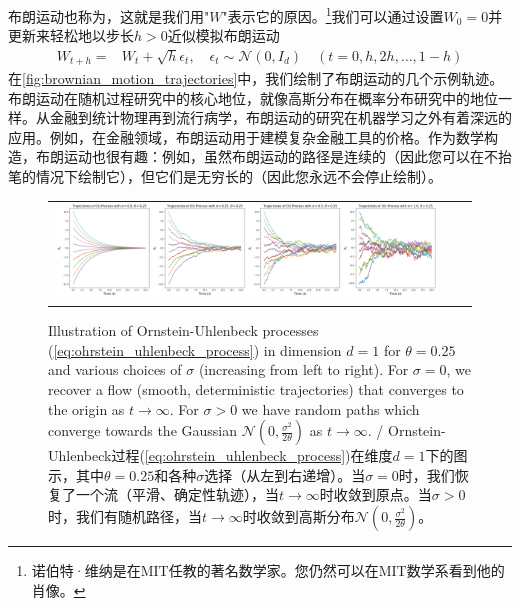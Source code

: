 布朗运动也称为，这就是我们用"$W$"表示它的原因。\footnote{诺伯特·维纳是在MIT任教的著名数学家。您仍然可以在MIT数学系看到他的肖像。}我们可以通过设置$W_0=0$并更新来轻松地以步长$h>0$近似模拟布朗运动
\begin{align}
    W_{t+h} =& W_{t} + \sqrt{h}\epsilon_t,\quad \epsilon_t\sim\mathcal{N}(0,I_d)\quad (t=0,h,2h,\dots,1-h)
\end{align}
在\cref{fig:brownian_motion_trajectories}中，我们绘制了布朗运动的几个示例轨迹。布朗运动在随机过程研究中的核心地位，就像高斯分布在概率分布研究中的地位一样。从金融到统计物理再到流行病学，布朗运动的研究在机器学习之外有着深远的应用。例如，在金融领域，布朗运动用于建模复杂金融工具的价格。作为数学构造，布朗运动也很有趣：例如，虽然布朗运动的路径是连续的（因此您可以在不抬笔的情况下绘制它），但它们是无穷长的（因此您永远不会停止绘制）。

\begin{figure}
    \centering
    \begin{tabular}{ccc}
         \includegraphics[width=\textwidth]{figures/ou_process.png} &
    \end{tabular}
    \caption{\label{fig:bm_ou_process} Illustration of Ornstein-Uhlenbeck processes (\cref{eq:ohrstein_uhlenbeck_process}) in dimension $d=1$ for $\theta=0.25$ and various choices of $\sigma$ (increasing from left to right). For $\sigma=0$, we recover a flow (smooth, deterministic trajectories) that converges to the origin as $t \to \infty$. For $\sigma>0$ we have random paths which converge towards the Gaussian $\mathcal{N}(0,\frac{\sigma^2}{2\theta})$ as $t\to\infty$. / Ornstein-Uhlenbeck过程(\cref{eq:ohrstein_uhlenbeck_process})在维度$d=1$下的图示，其中$\theta=0.25$和各种$\sigma$选择（从左到右递增）。当$\sigma=0$时，我们恢复了一个流（平滑、确定性轨迹），当$t \to \infty$时收敛到原点。当$\sigma>0$时，我们有随机路径，当$t\to\infty$时收敛到高斯分布$\mathcal{N}(0,\frac{\sigma^2}{2\theta})$。}
\end{figure} 

